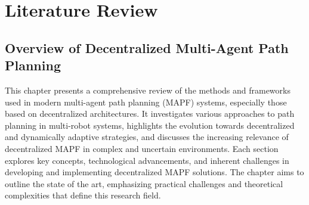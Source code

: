 \chapter{Literature Review}
\label{chap:literature_review}
\section{Overview of Decentralized Multi-Agent Path Planning}
This chapter presents a comprehensive review of the methods and frameworks used in modern multi-agent path planning (MAPF) systems, especially those based on decentralized architectures.
It investigates various approaches to path planning in multi-robot systems, highlights the evolution towards decentralized and dynamically adaptive strategies, and discusses the increasing relevance of decentralized MAPF in complex and uncertain environments. Each section explores key concepts, technological advancements, and inherent challenges in developing and implementing decentralized MAPF solutions. The chapter aims to outline the state of the art, emphasizing practical challenges and theoretical complexities that define this research field.

